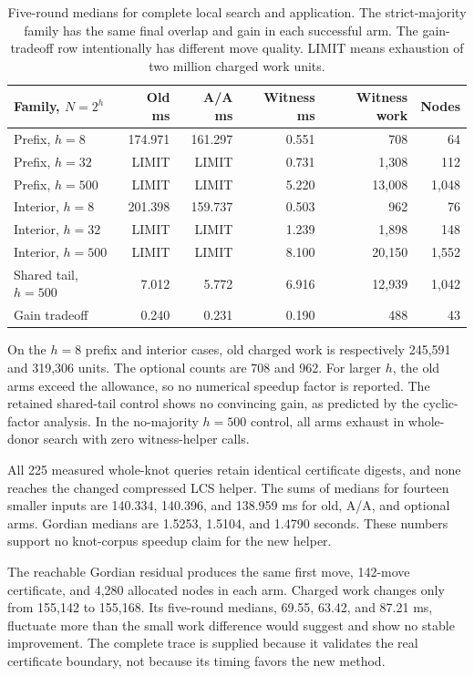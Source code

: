 \begin{table}[H]
\centering\small
\begin{tabular}{@{}lrrrrr@{}}
\toprule
Family, $N=2^h$ & Old ms & A/A ms & Witness ms & Witness work & Nodes\\
\midrule
Prefix, $h=8$ & 174.971 & 161.297 & 0.551 & 708 & 64\\
Prefix, $h=32$ & LIMIT & LIMIT & 0.731 & 1,308 & 112\\
Prefix, $h=500$ & LIMIT & LIMIT & 5.220 & 13,008 & 1,048\\
Interior, $h=8$ & 201.398 & 159.737 & 0.503 & 962 & 76\\
Interior, $h=32$ & LIMIT & LIMIT & 1.239 & 1,898 & 148\\
Interior, $h=500$ & LIMIT & LIMIT & 8.100 & 20,150 & 1,552\\
Shared tail, $h=500$ & 7.012 & 5.772 & 6.916 & 12,939 & 1,042\\
Gain tradeoff & 0.240 & 0.231 & 0.190 & 488 & 43\\
\bottomrule
\end{tabular}
\caption{Five-round medians for complete local search and application.
The strict-majority family has the same final overlap and gain in each
successful arm. The gain-tradeoff row intentionally has different move
quality. LIMIT means exhaustion of two million charged work units.}
\label{tab:overlap-times}
\end{table}

On the $h=8$ prefix and interior cases, old charged work is respectively
245,591 and 319,306 units. The optional counts are 708 and 962. For larger
$h$, the old arms exceed the allowance, so no numerical speedup factor is
reported. The retained shared-tail control shows no convincing gain, as
predicted by the cyclic-factor analysis. In the no-majority $h=500$ control,
all arms exhaust in whole-donor search with zero witness-helper calls.

All 225 measured whole-knot queries retain identical certificate digests,
and none reaches the changed compressed LCS helper. The sums of medians for
fourteen smaller inputs are 140.334, 140.396, and 138.959 ms for old, A/A,
and optional arms. Gordian medians are 1.5253, 1.5104, and 1.4790 seconds.
These numbers support no knot-corpus speedup claim for the new helper.

The reachable Gordian residual produces the same first move, 142-move
certificate, and 4,280 allocated nodes in each arm. Charged work changes
only from 155,142 to 155,168. Its five-round medians, 69.55, 63.42, and
87.21 ms, fluctuate more than the small work difference would suggest and
show no stable improvement. The complete trace is supplied because it
validates the real certificate boundary, not because its timing favors the
new method.


